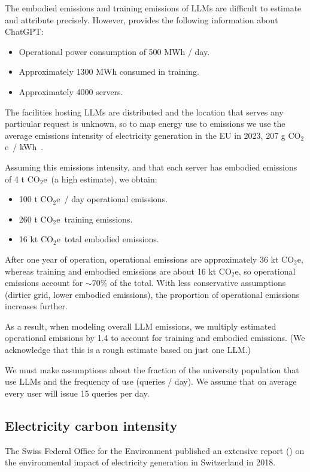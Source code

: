 \documentclass[11pt]{article}
\newcommand{\coe}{CO$_2$e}
\newcommand{\gcoe}{g \coe}
\newcommand{\gcoekwh}{\gcoe\ / kWh}
\begin{document}
The embodied emissions and training emissions of LLMs are difficult to estimate and attribute precisely. However, \textcite{devries2023growing} provides the following information about ChatGPT:
\begin{itemize}
  \item Operational power consumption of 500 MWh / day.
  \item Approximately 1300 MWh consumed in training.
  \item Approximately 4000 servers.
\end{itemize}

The facilities hosting LLMs are distributed and the location that serves any particular request is unknown, so to map energy use to emissions we use the average emissions intensity of electricity generation in the EU in 2023, 207 \gcoekwh~\cite{eea:emissions:2025}.

Assuming this emissions intensity, and that each server has embodied emissions of 4 t \coe\ (a high estimate), we obtain:
\begin{itemize}
  \item 100 t \coe\ / day operational emissions.
  \item 260 t \coe\ training emissions.
  \item 16 kt \coe\ total embodied emissions.
\end{itemize}

After one year of operation, operational emissions are approximately 36 kt \coe, whereas training and embodied emissions are about 16 kt \coe, so operational emissions account for $\sim 70\%$ of the total. With less conservative assumptions (dirtier grid, lower embodied emissions), the proportion of operational emissions increases further.

As a result, when modeling overall LLM emissions, we multiply estimated operational emissions by 1.4 to account for training and embodied emissions. (We acknowledge that this is a rough estimate based on just one LLM.)

We must make assumptions about the fraction of the university population that use LLMs and the frequency of use (queries / day). We assume that on average every user will issue 15 queries per day.

\subsection{Electricity carbon intensity}

The Swiss Federal Office for the Environment published an extensive report (\cite{krebs2018umweltbilanz}) on the environmental impact of electricity generation in Switzerland in 2018.
\end{document}
